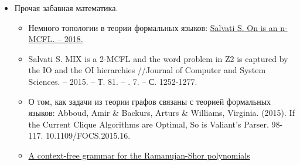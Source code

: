 \begin{itemize}
  \item Прочая забавная математика.
  \begin{itemize}
    \item Немного топологии в теории формальных языков: \href{https://hal.archives-ouvertes.fr/hal-01771670/}{Salvati S. On is an n-MCFL. – 2018.}
    \item Salvati S. MIX is a 2-MCFL and the word problem in Z2 is captured by the IO and the OI hierarchies //Journal of Computer and System Sciences. -- 2015. -- Т. 81. -- \textnumero. 7. -- С. 1252-1277.
    \item О том, как задачи из теории графов связаны с теорией формальных языков: Abboud, Amir \& Backurs, Arturs \& Williams, Virginia. (2015). If the Current Clique Algorithms are Optimal, So is Valiant's Parser. 98-117. 10.1109/FOCS.2015.16.
    \item \href{https://www.sciencedirect.com/science/article/abs/pii/S0196885819300739}{A context-free grammar for the Ramanujan-Shor polynomials}
  \end{itemize}
\end{itemize}
